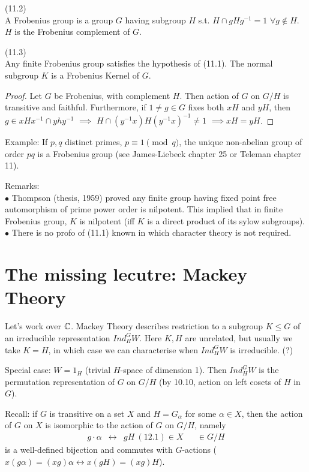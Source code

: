 \documentclass[a4paper]{article}
\begin{document}
\begin{defi} (11.2)\\
A Frobenius group is a group $G$ having subgroup $H$ s.t. $H \cap gHg^{-1} = 1$ $\forall g \not\in H$.\\
$H$ is the Frobenius complement of $G$.
\end{defi}

\begin{prop} (11.3)\\
Any finite Frobenius group satisfies the hypothesis of (11.1). The normal subgroup $K$ is a Frobenius Kernel of $G$.
\begin{proof}
Let $G$ be Frobenius, with complement $H$. Then action of $G$ on $G/H$ is transitive and faithful. Furthermore, if $1 \neq g \in G$ fixes both $xH$ and $yH$, then $g \in xHx^{-1} \cap yhy^{-1}$ $\implies$ $H \cap (y^{-1} x) H (y^{-1}x)^{-1} \neq 1$ $\implies xH = yH$.
\end{proof}
\end{prop}

Example: If $p,q$ distinct primes, $p \equiv 1 \pmod q$, the unique non-abelian group of order $pq$ is a Frobenius group (see James-Liebeck chapter 25 or Teleman chapter 11).

Remarks:\\
$\bullet$ Thompson (thesis, 1959) proved any finite group having fixed point free automorphism of prime power order is nilpotent. This implied that in finite Frobenius group, $K$ is nilpotent (iff $K$ is a direct product of its sylow subgroups).\\
$\bullet$ There is no profo of (11.1) known in which character theory is not required.

\newpage
\section{The missing lecutre: Mackey Theory}
Let's work over $\mathbb{C}$. Mackey Theory describes restriction to a subgroup $K \leq G$ of an irreducible representation $Ind_H^G W$. Here $K,H$ are unrelated, but usually we take $K=H$, in which case we can characterise when $Ind_H^G W$ is irreducible. (?)

Special case: $W=1_H$ (trivial $H$-space of dimension 1). Then $Ind_H^G W$ is the permutation representation of $G$ on $G/H$ (by 10.10, action on left cosets of $H$ in $G$).

Recall: if $G$ is transitive on a set $X$ and $H=G_\alpha$ for some $\alpha \in X$, then the action of $G$ on $X$ is isomorphic to the action of $G$ on $G/H$, namely
\begin{equation*}
\begin{aligned}
g \cdot \alpha & \leftrightarrow &gH \ (12.1)
\in X & & \in G/H
\end{aligned}
\end{equation*}
is a well-defined bijection and commutes with $G$-actions ($x(g\alpha) = (xg)\alpha \leftrightarrow x(gH) = (xg)H$).
\end{document}
